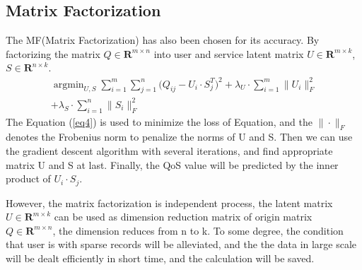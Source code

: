 \documentclass[conference]{IEEEtran}
\begin{document}
\subsection{Matrix Factorization}
The MF(Matrix Factorization) has also been chosen for its accuracy. By factorizing the matrix $Q\in \textbf{R}^{m \times n} $ into user and service latent matrix $U\in \textbf{R}^{m \times k}$, $S \in \textbf{R}^{n \times k}$. 
\begin{equation}
\begin{aligned}
\mathop{\arg\min}_{U,S} \sum_{i=1}^{m}{\sum_{j=1}^{n}{
(Q_{ij}-U_{i} \cdot S_{j}^{T}})^{2}
}
 + \lambda_{U} \cdot \sum_{i=1}^{m}\|U_{i}\|_{F}^{2} \\
+ \lambda_{S} \cdot \sum_{i=1}^{n}\|S_{i}\|_{F}^{2}
\label{eq4}
\end{aligned}
\end{equation}
The Equation (\ref{eq4}) is used to minimize the loss of Equation, and the $\| \cdot \|_{F}$ denotes the Frobenius norm\cite{chen_user_2016} to penalize the norms of U and S. Then we can use the gradient descent algorithm with several iterations, and find appropriate matrix U and S at last. Finally, the QoS value will be predicted by the inner product of $U_{i} \cdot S_{j}$. 
\par However, the matrix factorization is independent process, the latent matrix $U \in \textbf{R}^{m \times k}$ can be used as dimension reduction matrix of origin matrix $Q \in \textbf{R}^{m \times n}$, the dimension reduces from n to k. To some degree, the condition that user is with sparse records will be alleviated, and the the data in large scale will be dealt efficiently in short time, and the calculation will be saved.
\end{document}
